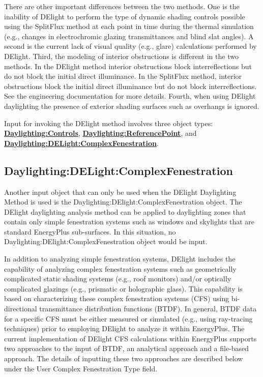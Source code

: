 There are other important differences between the two methods. One is the inability of DElight to perform the type of dynamic shading controls possible using the SplitFlux method at each point in time during the thermal simulation (e.g., changes in electrochromic glazing transmittances and blind slat angles).  A second is the current lack of visual quality (e.g., glare) calculations performed by DElight. Third, the modeling of interior obstructions is different in the two methods. In the DElight method interior obstructions block interreflections but do not block the initial direct illuminance. In the SplitFlux method, interior obstructions block the initial direct illuminance but do not block interreflections. See the engineering documentation for more details. Fourth, when using DElight daylighting the presence of exterior shading surfaces such as overhangs is ignored.

Input for invoking the DElight method involves three object types: \textbf{\hyperref[daylightingcontrols-000]{Daylighting:Controls}}, \textbf{\hyperref[daylightingreferencepoint-000]{Daylighting:ReferencePoint}}, and \textbf{\hyperref[daylightingdelightcomplexfenestration]{Daylighting:DELight:ComplexFenestration}}.


\subsection{Daylighting:DELight:ComplexFenestration}\label{daylightingdelightcomplexfenestration}

Another input object that can only be used when the DElight Daylighting Method is used is  the Daylighting:DElight:ComplexFenestration object. The DElight daylighting analysis method can be applied to daylighting zones that contain only simple fenestration systems such as windows and skylights that are standard EnergyPlus sub-surfaces. In this situation, no Daylighting:DElight:ComplexFenestration object would be input.

In addition to analyzing simple fenestration systems, DElight includes the capability of analyzing complex fenestration systems such as geometrically complicated static shading systems (e.g., roof monitors) and/or optically complicated glazings (e.g., prismatic or holographic glass). This capability is based on characterizing these complex fenestration systems (CFS) using bi-directional transmittance distribution functions (BTDF). In general, BTDF data for a specific CFS must be either measured or simulated (e.g., using ray-tracing techniques) prior to employing DElight to analyze it within EnergyPlus. The current implementation of DElight CFS calculations within EnergyPlus supports two approaches to the input of BTDF, an analytical approach and a file-based approach. The details of inputting these two approaches are described below under the User Complex Fenestration Type field.

